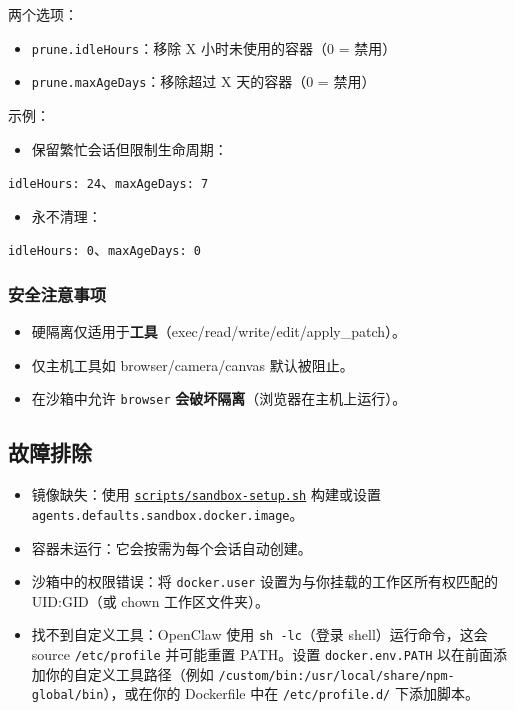 两个选项：

\begin{itemize}
  \item \texttt{prune.idleHours}：移除 X 小时未使用的容器（0 = 禁用）
  \item \texttt{prune.maxAgeDays}：移除超过 X 天的容器（0 = 禁用）
\end{itemize}


示例：

\begin{itemize}
  \item 保留繁忙会话但限制生命周期：
\end{itemize}

\texttt{idleHours: 24}、\texttt{maxAgeDays: 7}
\begin{itemize}
  \item 永不清理：
\end{itemize}

\texttt{idleHours: 0}、\texttt{maxAgeDays: 0}

\subsubsection{安全注意事项}


\begin{itemize}
  \item 硬隔离仅适用于\textbf{工具}（exec/read/write/edit/apply\_patch）。
  \item 仅主机工具如 browser/camera/canvas 默认被阻止。
  \item 在沙箱中允许 \texttt{browser} \textbf{会破坏隔离}（浏览器在主机上运行）。
\end{itemize}


\subsection{故障排除}


\begin{itemize}
  \item 镜像缺失：使用 \href{https://github.com/openclaw/openclaw/blob/main/scripts/sandbox-setup.sh}{\texttt{scripts/sandbox-setup.sh}} 构建或设置 \texttt{agents.defaults.sandbox.docker.image}。
  \item 容器未运行：它会按需为每个会话自动创建。
  \item 沙箱中的权限错误：将 \texttt{docker.user} 设置为与你挂载的工作区所有权匹配的 UID:GID（或 chown 工作区文件夹）。
  \item 找不到自定义工具：OpenClaw 使用 \texttt{sh -lc}（登录 shell）运行命令，这会 source \texttt{/etc/profile} 并可能重置 PATH。设置 \texttt{docker.env.PATH} 以在前面添加你的自定义工具路径（例如 \texttt{/custom/bin:/usr/local/share/npm-global/bin}），或在你的 Dockerfile 中在 \texttt{/etc/profile.d/} 下添加脚本。
\end{itemize}



